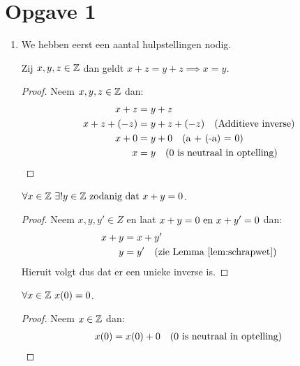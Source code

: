 \documentclass{article}
\begin{document}
\section*{Opgave 1}
\begin{enumerate}[label=\alph*)]
    \item We hebben eerst een aantal hulpstellingen nodig.
          \begin{lemma}[Schrapwet]\label{lem:schrapwet}
              Zij $x, y, z \in \mathbb{Z}$ dan geldt $x + z = y + z \implies x = y$.
              \begin{proof}
                  Neem $x, y, z \in \mathbb{Z}$ dan:
                  \begin{align*}
                      x + z        & = y + z                                       \\
                      x + z + (-z) & = y + z + (-z) \quad (\text{Additieve inverse}) \\
                      x + 0        & = y + 0 \quad (\text{a + (-a) = 0})             \\
                      x            & = y \quad (0 \text{ is neutraal in optelling})
                  \end{align*}
              \end{proof}
          \end{lemma}
          \begin{lemma}\label{lem:unieke-inverse}
              \(\forall x \in \mathbb{Z} \ \exists ! y \in \mathbb{Z} \text{ zodanig dat } x + y = 0 \).
              \begin{proof}
                  Neem \(x, y, y' \in Z \) en laat \( x + y = 0 \text{ en } x + y' = 0\) dan:
                  \begin{align*}
                      x + y & = x + y'                                        \\
                      y     & = y' \quad (\text{zie Lemma \ref{lem:schrapwet}})
                  \end{align*}
                  Hieruit volgt dus dat er een unieke inverse is.
              \end{proof}
          \end{lemma}
          \begin{lemma}\label{lem:vermenigvuldiging-met-nul}
              \(\forall x \in \mathbb{Z} \ x(0) = 0 \).
              \begin{proof}
                  Neem $x \in \mathbb{Z}$ dan:
                  \begin{align*}
                      x(0) & = x(0) + 0 \quad (0 \tx{ is neutraal in optelling})              \\

\end{align*}
\end{proof}
\end{lemma}
\end{enumerate}
\end{document}
